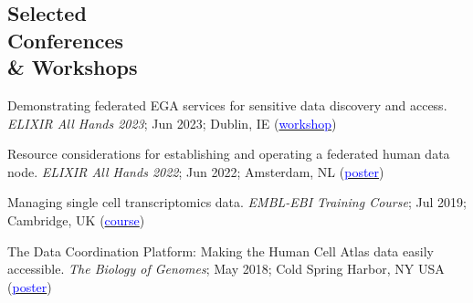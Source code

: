 \documentclass[margin,line]{res}
\begin{document}
\begin{resume}

\section{\sc Selected\\ Conferences\\ \& Workshops}


Demonstrating federated EGA services for sensitive data discovery and access. {\em ELIXIR All Hands 2023}; Jun 2023; Dublin, IE (\href{https://f1000research.com/slides/12-638}{\textcolor{blue}{workshop}})

Resource considerations for establishing and operating a federated human data node. {\em ELIXIR All Hands 2022}; Jun 2022; Amsterdam, NL (\href{https://f1000research.com/posters/11-594}{\textcolor{blue}{poster}})


Managing single cell transcriptomics data. {\em EMBL-EBI Training Course}; Jul 2019; Cambridge, UK (\href{https://www.ebi.ac.uk/training/events/managing-single-cell-transcriptomics-data/}{\textcolor{blue}{course}})


The Data Coordination Platform: Making the Human Cell Atlas data easily accessible. {\em The Biology of Genomes}; May 2018; Cold Spring Harbor, NY USA (\href{https://drive.google.com/file/d/1KMs4VWE_1rEAFeKLHWrFxHaly5Db78By/view?usp=sharing}{\textcolor{blue}{poster}})





\end{resume}
\end{document}
